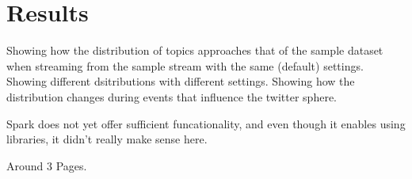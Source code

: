 \chapter{Results}
\label{ch:results}

Showing how the distribution of topics approaches that of the sample dataset when streaming from the sample stream with the same (default) settings.
Showing different dsitributions with different settings.
Showing how the distribution changes during events that influence the twitter sphere.

Spark does not yet offer sufficient funcationality,
and even though it enables using libraries,
it didn't really make sense here.

Around 3 Pages.
\pagebreak[3]
